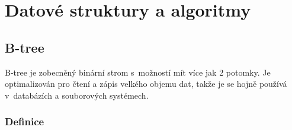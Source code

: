 \chapter{Datové struktury a algoritmy}


\section{B-tree}

B-tree\cite{Cormen:2001:IA:580470} je zobecněný binární strom s~možností
mít více jak 2 potomky.
Je optimalizován pro čtení a zápis velkého
objemu dat, takže je se hojně používá v~databázích a souborových
systémech.

\subsection{Definice}

